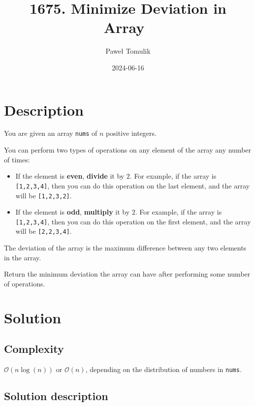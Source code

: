 \documentclass[paper=a4,parskip=half,DIV=12]{leetcode}
\begin{document}
\title{1675. Minimize Deviation in Array~\cite{leetcode:1675}}
\subtitle{}
\author{Paweł Tomulik}
\date{2024-06-16}
\maketitle

\section{Description}
\label{sec:description}

You are given an array \texttt{nums} of $n$ positive integers.

You can perform two types of operations on any element of the array any number
of times:

\begin{itemize}
  \item If the element is \textbf{even}, \textbf{divide} it by $2$. For example, if
    the array is \texttt{[1,2,3,4]}, then you can do this operation on the
    last element, and the array will be \texttt{[1,2,3,2]}.
  \item
    If the element is \textbf{odd}, \textbf{multiply} it by $2$. For example,
    if the array is \texttt{[1,2,3,4]}, then you can do this operation on the first
    element, and the array will be \texttt{[2,2,3,4]}.
\end{itemize}
The deviation of the array is the maximum difference between any two elements
in the array.

Return the minimum deviation the array can have after performing some number of
operations.

\section{Solution}
\label{sec:solution}

\subsection{Complexity}
\label{sec:complexity}

$\mathcal{O}(n \log{(n)})$ or $\mathcal{O}(n)$, depending on the distribution of numbers in \texttt{nums}.

\subsection{Solution description}
\label{sec:solution-description}
\end{document}
